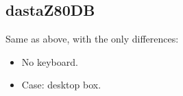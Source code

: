 \documentclass[a4paper,11pt]{article}
\begin{document}
    \subsection{dastaZ80DB}

    Same as above, with the only differences:

    \begin{itemize}
        \item No keyboard.
        \item Case: desktop box.
    \end{itemize}

    \pagebreak
    
    \pagebreak
    
    \pagebreak
    
    \pagebreak
    
    \pagebreak
    
    \pagebreak
    
    
    \pagebreak

    \pagebreak
    
    
\end{document}
